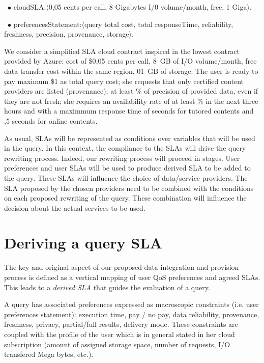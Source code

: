 \begin{trivlist}\sf\footnotesize
\item[~$\bullet$ ]  {\sf cloudSLA:$\langle$0,05 cents per call, 8 Gigabytes I/0 volume/month, free, 1 Giga$\rangle$}. 
\item[~$\bullet$ ] {\sf preferencesStatement:$\langle$query total cost,  total responseTime, reliability, freshness, precision, provenance, storage$\rangle$}. 
\end{trivlist}


We consider a simplified SLA cloud contract inspired in the lowest contract provided by Azure: {\sf cost of \$0,05 cents per call,  8~GB of I/O volume/month, free data transfer cost within the same region,  01~GB of storage}. 
The user is ready to pay maximum {\sf \$1 as total query cost}; she requests that only {\sf certified} content providers are listed (provenance); at least {$\%$} of precision of provided data, even if they are not fresh; she requires an availability rate of at least {$\%$} in the next three hours and with a maximmum response time of {} seconds for tutored contents and {,5} seconds for online contents.

As usual, SLAs will be represented as conditions over variables that will be used in the query.
In this context, the compliance to the SLAs will drive the query rewriting process.
Indeed, our rewriting process will proceed in stages.
User preferences and user SLAs will be used to produce derived SLA to be added to the query. 
These SLAs will influence the choice of data/service providers.
The SLA proposed by the chosen providers need to be combined with the conditions on each proposed rewriting of the query.
These combination will influence the decision about the actual services to be used.

\section{Deriving a query SLA}
\label{sec:slaModel}

The key and original aspect of   our proposed data integration and provision process is  defined as a vertical mapping of user QoS preferences and agreed SLAs. This  leads to a {\em derived SLA} that guides the evaluation of a query. 

A query has associated preferences  expressed as macroscopic constraints (i.e. user preferences statement): execution time, pay / no pay, data reliability, provenance, freshness, privacy, partial/full results, delivery mode. These constraints are coupled with the profile of the user which is in general stated in her cloud subscription (amount of assigned storage space, number of requests, I/O transfered Mega bytes, etc.). 

